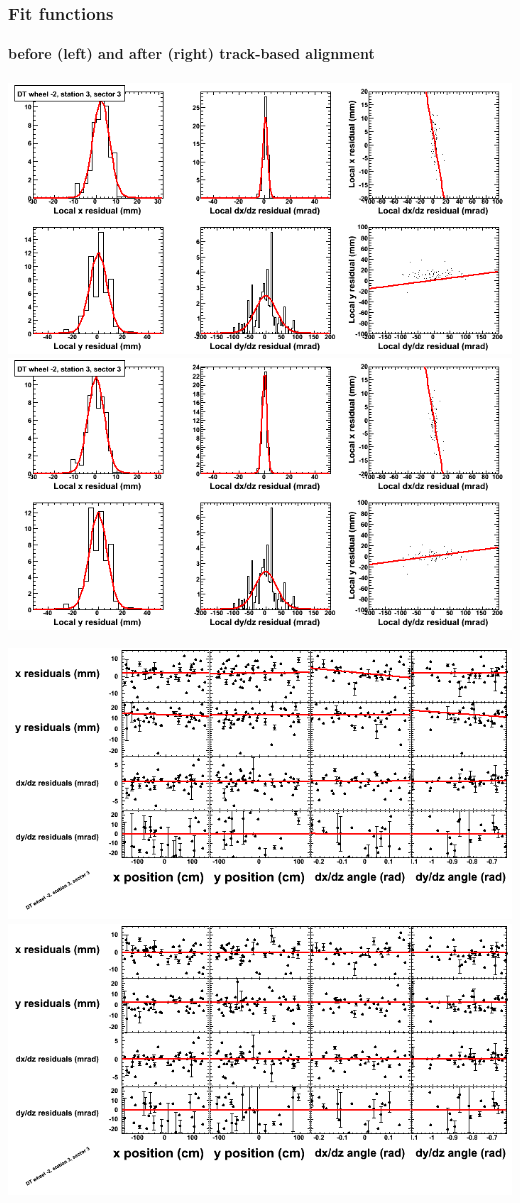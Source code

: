 \documentclass[compress]{beamer}
\begin{document}
\begin{frame}
\frametitle{Fit functions}
\framesubtitle{before (left) and after (right) track-based alignment}
\includegraphics[width=0.5\linewidth]{fitfunctions_re01/MBwhAst3sec03_bellcurves.png} \includegraphics[width=0.5\linewidth]{fitfunctions_re05/MBwhAst3sec03_bellcurves.png}

\includegraphics[width=0.5\linewidth]{fitfunctions_re01/MBwhAst3sec03_polynomials.png} \includegraphics[width=0.5\linewidth]{fitfunctions_re05/MBwhAst3sec03_polynomials.png}
\end{frame}
\end{document}
